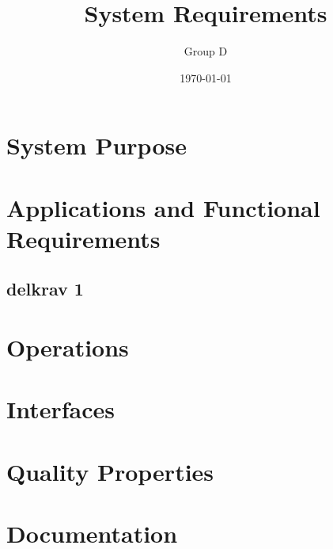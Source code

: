 \documentclass[a4paper]{article}
\title{System Requirements}
\author{Group D}
\date{\today}
\begin{document}
	\maketitle
	\thispagestyle{empty}
	\setcounter{page}{0}
	\pagebreak
	\tableofcontents
	\pagebreak
	

	\section{System Purpose} %
	\section{Applications and Functional Requirements}
	\subsection{delkrav 1}
	\section{Operations}
	\section{Interfaces}
	\section{Quality Properties}
	\section{Documentation}
	
\end{document}
